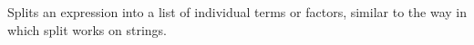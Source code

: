 
Splits an expression into a list of individual terms or factors,
similar to the way in which split works on strings.
